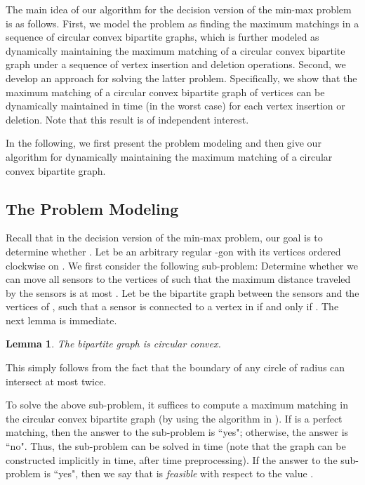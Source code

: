 \documentclass[11pt]{article}
\newenvironment{proof}{\noindent {\textbf{Proof:}}\rm}{\hfill 
\rm}
\newtheorem{Lem}{Lemma}
\begin{document}
The main idea of our algorithm for the decision version of the
min-max problem is as follows. First, we model the problem as
finding the maximum matchings in a sequence of  circular convex
bipartite graphs, which is further modeled as dynamically
maintaining the maximum matching of a circular convex bipartite
graph under a sequence of  vertex insertion and deletion operations.
Second, we develop an approach for solving the latter problem.
Specifically, we show that the maximum matching of a circular convex
bipartite graph of  vertices can be dynamically maintained in  time
(in the worst case) for each vertex insertion or deletion. Note that
this result is of independent interest.



In the following, we first present the problem modeling and then
give our algorithm for dynamically maintaining the maximum matching of
a circular convex bipartite graph.

\subsection{The Problem Modeling}
\label{subsec-model}

Recall that in the decision version of the min-max problem,
our goal is to determine whether . Let  be an arbitrary regular -gon with its vertices
 ordered clockwise on . We first
consider the following sub-problem: Determine whether we can move all sensors to
the vertices of  such that the maximum distance traveled by the
sensors is at most . Let  be the bipartite graph
between the sensors  and the vertices of ,
such that a sensor  is connected to a vertex  in  if and only
if .  The next lemma is immediate.
\begin{Lem}\label{lem:cir-conv}
The bipartite graph  is circular convex.
\end{Lem}
\begin{proof}
This simply follows from the fact that the boundary of any circle of radius 
can intersect  at most twice.
\end{proof}

To solve the above sub-problem, it suffices to compute a maximum matching 
in the circular convex bipartite graph  (by using the algorithm
in \cite{ref:LiangCi95}). If  is a
perfect matching, then the answer to the sub-problem is ``yes";
otherwise, the answer is ``no". Thus, the sub-problem can be solved in
 time (note that the graph  can be constructed implicitly
in  time, after  time preprocessing).
If the answer to the sub-problem is ``yes", then we say
that  is {\em feasible} with respect to the value .
\end{document}
